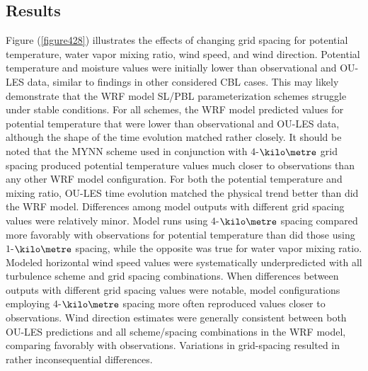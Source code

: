 \subsection{Results}
\label{res-462}

Figure (\autoref{figure428}) illustrates the effects of changing grid spacing for potential temperature, water vapor mixing ratio, wind speed, and wind direction. Potential temperature and moisture values were initially lower than observational and OU-LES data, similar to findings in other considered CBL cases. This may likely demonstrate that the WRF model SL\slash PBL parameterization schemes struggle under stable conditions. For all schemes, the WRF model predicted values for potential temperature that were lower than observational and OU-LES data, although the shape of the time evolution matched rather closely. It should be noted that the MYNN scheme used in conjunction with $4$-$\kilo\metre$ grid spacing produced potential temperature values much closer to observations than any other WRF model configuration. For both the potential temperature and mixing ratio, OU-LES time evolution matched the physical trend better than did the WRF model. Differences among model outputs with different grid spacing values were relatively minor. Model runs using $4$-$\kilo\metre$ spacing compared more favorably with observations for potential temperature than did those using $1$-$\kilo\metre$ spacing, while the opposite was true for water vapor mixing ratio. Modeled horizontal wind speed values were systematically underpredicted with all turbulence scheme and grid spacing combinations. When differences between outputs with different grid spacing values were notable, model configurations employing $4$-$\kilo\metre$ spacing more often reproduced values closer to observations. Wind direction estimates were generally consistent between both OU-LES predictions and all scheme\slash spacing combinations in the WRF model, comparing favorably with observations. Variations in grid-spacing resulted in rather inconsequential differences.


